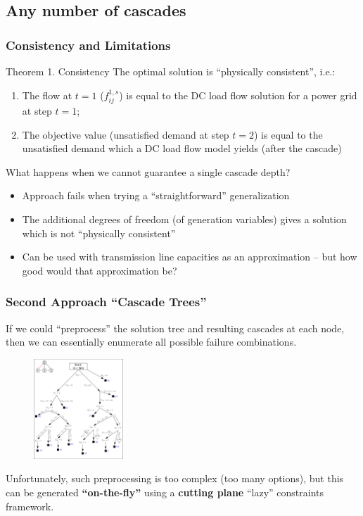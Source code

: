 \documentclass{beamer}
\begin{document}
\subsection{Any number of cascades}
\begin{frame}
\frametitle{Consistency and Limitations}
\begin{block}{Theorem 1. Consistency}
The optimal solution is ``physically consistent'', i.e.:
\begin{enumerate}
\item The flow at $t=1$ ($f_{ij}^{1,s}$) is equal to the DC load flow solution for a power grid at step $t=1$;
\item The objective value (unsatisfied demand at step $t=2$) is equal to the unsatisfied demand which a DC load flow model yields (after the cascade)
\end{enumerate}
\end{block}\pause
What happens when we cannot guarantee a single cascade depth? 
\begin{itemize}
	\item Approach fails when trying a ``straightforward'' generalization
	\item The additional degrees of freedom (of generation variables) gives a solution which is not ``physically consistent''
	\item Can be used with transmission line capacities as an approximation -- but how good would that approximation be?
\end{itemize}
\end{frame}

\begin{frame}
\frametitle{Second Approach ``Cascade Trees''}
If we could ``preprocess'' the solution tree and resulting cascades at each node, then we can essentially enumerate all possible failure combinations.
\begin{figure}[h]
	\centering
		\includegraphics[width=0.30\textwidth]{Aux_files/figure_4_three-step-cascade-tree.png}
	\label{fig:figure_4_three-step-cascade-tree}
\end{figure}
Unfortunately, such preprocessing is too complex (too many options), but this can be generated \textbf{``on-the-fly''} using a \textbf{cutting plane} ``lazy'' constraints framework.
\end{frame}
\end{document}
